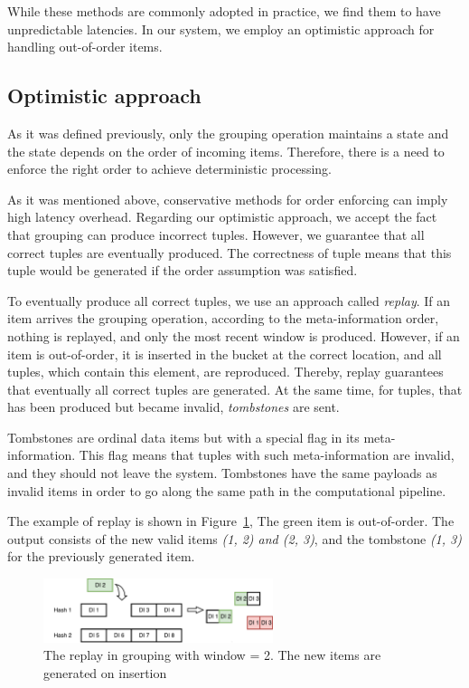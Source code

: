 While these methods are commonly adopted in practice, we find them to have unpredictable latencies. In our system, we employ an optimistic approach for handling out-of-order items.

\subsection{Optimistic approach}

As it was defined previously, only the grouping operation maintains a state and the state depends on the order of incoming items. Therefore, there is a need to enforce the right order to achieve deterministic processing.

As it was mentioned above, conservative methods for order enforcing can imply high latency overhead. Regarding our optimistic approach, we accept the fact that grouping can produce incorrect tuples. However, we guarantee that all correct tuples are eventually produced. The correctness of tuple means that this tuple would be generated if the order assumption was satisfied.

To eventually produce all correct tuples, we use an approach called {\it replay}. If an item arrives the grouping operation, according to the meta-information order, nothing is replayed, and only the most recent window is produced. However, if an item is out-of-order, it is inserted in the bucket at the correct location, and all tuples, which contain this element, are reproduced. Thereby, replay guarantees that eventually all correct tuples are generated. At the same time, for tuples, that has been produced but became invalid, {\it tombstones} are sent.

Tombstones are ordinal data items but with a special flag in its meta-information. This flag means that tuples with such meta-information are invalid, and they should not leave the system. Tombstones have the same payloads as invalid items in order to go along the same path in the computational pipeline.

The example of replay is shown in Figure~\ref{grouping-replaying}, The green item is out-of-order. The output consists of the new valid items {\it (1, 2) and (2, 3)}, and the tombstone {\it (1, 3)} for the previously generated item.

\begin{figure}[ht]
  \centering
  \includegraphics[width=0.6\textwidth]{pics/grouping-replaying}
  \caption{The replay in grouping with window = 2. The new items are generated on insertion}
  \label {grouping-replaying}
\end{figure}

